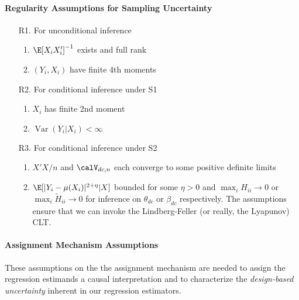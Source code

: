 \documentclass[12pt]{article}
\theoremstyle{plain}
\theoremstyle{definition}
\theoremstyle{remark}
\newcommand{\ra}{\rightarrow}
\newcommand{\Var}{\operatorname{Var}}
\begin{document}
\paragraph{Regularity Assumptions for Sampling Uncertainty}
\begin{enumerate}
  \item[R1.] For unconditional inference
    \begin{enumerate}[label=(\roman*)]
      \item $\E[X_iX_i']^{-1}$ exists and full rank
      \item $(Y_i,X_i)$ have finite 4th moments
    \end{enumerate}
  \item[R2.] For conditional inference under S1
    \begin{enumerate}[label=(\roman*)]
      \item $X_i$ has finite 2nd moment
      \item $\Var(Y_i|X_i)<\infty$
    \end{enumerate}
  \item[R3.] For conditional inference under S2
    \begin{enumerate}[label=(\roman*)]
      \item $X'X/n$ and $\calV_{dc,n}$ each converge to some positive
        definite limits
      \item $\E[|Y_i-\mu(X_i)|^{2+\eta}|X]$ bounded for some $\eta>0$
        and
        $\max_i H_{ii}\ra 0$ or $\max_i \tilde{H}_{ii}\ra 0$
        for inference on $\theta_{dc}$ or $\beta_{dc}$ respectively.
        The assumptions ensure that we can invoke the Lindberg-Feller
        (or really, the Lyapunov) CLT.
    \end{enumerate}
\end{enumerate}

\clearpage
\paragraph{Assignment Mechanism Assumptions}
These assumptions on the the assignment mechanism are needed to assign
the regression estimands a causal interpretation and to characterize the
\emph{design-based uncertainty} inherent in our regression estimators.
\end{document}
